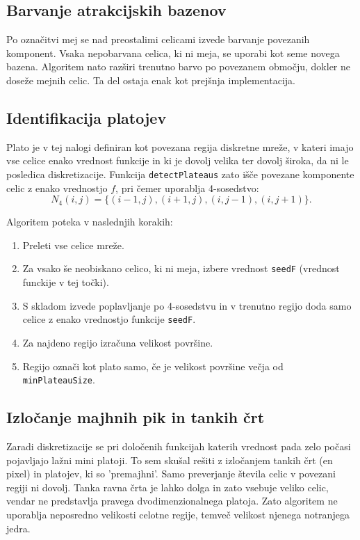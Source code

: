 \documentclass[12pt,a4paper]{article}
\begin{document}
\subsection{Barvanje atrakcijskih bazenov}

Po označitvi mej se nad preostalimi celicami izvede barvanje povezanih komponent. Vsaka nepobarvana celica, ki ni meja, se uporabi kot seme novega bazena. Algoritem nato razširi trenutno barvo po povezanem območju, dokler ne doseže mejnih celic. Ta del ostaja enak kot prejšnja implementacija.


\subsection{Identifikacija platojev}

Plato je v tej nalogi definiran kot povezana regija diskretne mreže, v kateri imajo vse celice enako vrednost funkcije in ki je dovolj velika ter dovolj široka, da ni le posledica diskretizacije. Funkcija \texttt{detectPlateaus} zato išče povezane komponente celic z enako vrednostjo \(f\), pri čemer uporablja 4-sosedstvo:
\[
N_4(i,j)=\{(i-1,j),(i+1,j),(i,j-1),(i,j+1)\}.
\]

Algoritem poteka v naslednjih korakih:

\begin{enumerate}[label=\arabic*.]
    \item Preleti vse celice mreže.
    \item Za vsako še neobiskano celico, ki ni meja, izbere vrednost \texttt{seedF} (vrednost funckije v tej točki).
    \item S skladom izvede poplavljanje po 4-sosedstvu in v trenutno regijo doda samo celice z enako vrednostjo funkcije \texttt{seedF}.
    \item Za najdeno regijo izračuna velikost površine.
    \item Regijo označi kot plato samo, če je velikost površine večja od \texttt{minPlateauSize}.
\end{enumerate}


\subsection{Izločanje majhnih pik in tankih črt}

Zaradi diskretizacije se pri določenih funkcijah katerih vrednost pada zelo počasi pojavljajo lažni mini platoji. To sem skušal rešiti z izločanjem tankih črt (en pixel) in platojev, ki so 'premajhni'.
Samo preverjanje števila celic v povezani regiji ni dovolj. Tanka ravna črta je lahko dolga in zato vsebuje veliko celic, vendar ne predstavlja pravega dvodimenzionalnega platoja. Zato algoritem ne uporablja neposredno velikosti celotne regije, temveč velikost njenega notranjega jedra.
\end{document}
